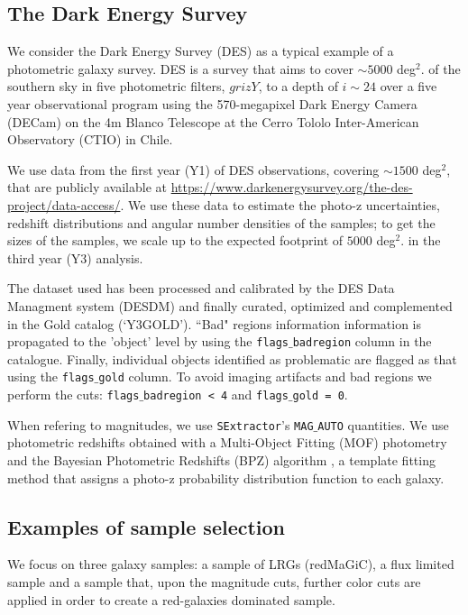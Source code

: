 \documentclass[a4paper,fleqn,usenatbib]{mnras}
\begin{document}
\subsection{The Dark Energy Survey}


We consider the Dark Energy Survey (DES) as a typical example of a photometric galaxy survey. DES is a  survey that aims to cover $\sim 5000$  deg$^2$. of the southern sky in five photometric filters, $grizY$, to a depth of $i \sim 24$ over a five year observational program using the 570-megapixel Dark Energy Camera (DECam) on the 4m Blanco Telescope at the Cerro Tololo Inter-American Observatory (CTIO) in Chile.

We use data from the first year (Y1) of DES observations, covering $\sim 1500$ deg$^2$, that are publicly available at  \url{https://www.darkenergysurvey.org/the-des-project/data-access/}. We use these data to estimate the photo-z uncertainties, redshift distributions and angular number densities of the samples; to get the sizes of the samples, we scale up to the expected footprint of $5000$  deg$^2$. in the third year (Y3) analysis.

The dataset used has been processed and calibrated by the DES Data Managment system (DESDM) and finally curated, optimized and complemented in the Gold catalog (`Y3GOLD'). ``Bad" regions information information is propagated to the 'object' level by using the \texttt{flags{$\_$}badregion} column in the catalogue. Finally, individual objects identified as problematic are flagged as that using the \texttt{flags{$\_$}gold} column. To avoid imaging artifacts and bad regions we perform the cuts: \texttt{flags{$\_$}badregion < 4} and \texttt{flags{$\_$}gold = 0}.

When refering to magnitudes, we use \texttt{SExtractor}'s \citep{Bertin1996}  \texttt{MAG{$\_$}AUTO} quantities. We use photometric redshifts obtained with a Multi-Object Fitting (MOF) photometry \citep[section 6.3]{Drlica2018} and the Bayesian Photometric Redshifts (BPZ) algorithm \citep{Benitez}, a template fitting method that assigns a photo-z probability distribution function to each galaxy.



\subsection{Examples of sample selection}
\label{subsec: Sample_Selection}

We focus on three galaxy samples: a sample of LRGs (redMaGiC), a flux limited sample and a sample that, upon the magnitude cuts, further color cuts are applied in order to create a red-galaxies dominated sample.
\end{document}
